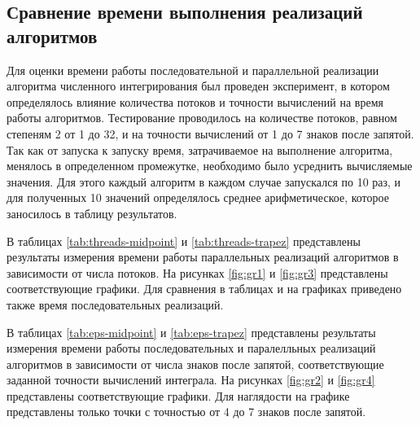 \subsection{Сравнение времени выполнения реализаций алгоритмов}

Для оценки времени работы последовательной и параллельной реализации алгоритма численного интегрирования был проведен эксперимент, в котором определялось влияние количества потоков и точности вычислений на время работы алгоритмов. Тестирование проводилось на количестве потоков, равном степеням 2 от 1 до 32, и на точности вычислений от 1 до 7 знаков после запятой. Так как от запуска к запуску время, затрачиваемое на выполнение алгоритма, менялось в определенном промежутке, необходимо было усреднить вычисляемые значения. Для этого каждый алгоритм в каждом случае запускался по 10 раз, и для полученных 10 значений определялось среднее арифметическое, которое заносилось в таблицу результатов.

В таблицах \ref{tab:threads-midpoint} и \ref{tab:threads-trapez} представлены результаты измерения времени работы параллельных реализаций алгоритмов в зависимости от числа потоков. На рисунках \ref{fig:gr1} и \ref{fig:gr3} представлены соответствующие графики. Для сравнения в таблицах и на графиках приведено также время последовательных реализаций.

В таблицах \ref{tab:eps-midpoint} и \ref{tab:eps-trapez} представлены результаты измерения времени работы последовательных и паралелльных реализаций алгоритмов в зависимости от числа знаков после запятой, соответствующие заданной точности вычислений интеграла. На рисунках \ref{fig:gr2} и \ref{fig:gr4} представлены соответствующие графики. Для наглядости на графике представлены только точки с точностью от 4 до 7 знаков после запятой.

\clearpage

